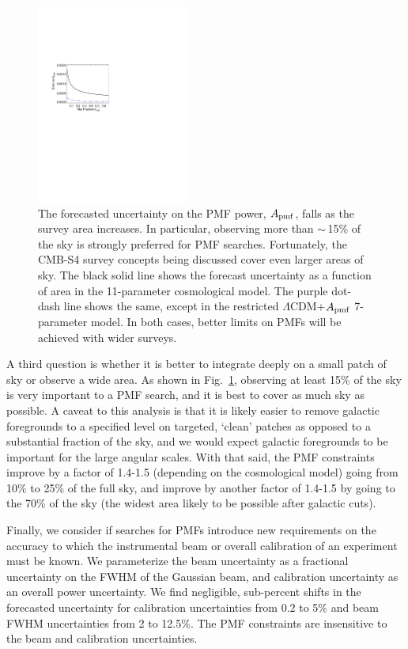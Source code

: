 \documentclass[apj]{emulateapj}
\newcommand{\apmf}{\ensuremath{A_{\rm pmf}}}
\newcommand{\lcdm}{\ensuremath{\Lambda}CDM}
\begin{document}
\begin{figure}[htb]\centering
\includegraphics[width=0.45\textwidth,clip,trim={1.5cm 12.5cm 11cm 7.5cm}]{pmf_area.pdf}
  \caption[Area dependence]{
  The forecasted uncertainty on the PMF power, \apmf{}, falls as the survey area increases. 
  In particular, observing more than $\sim$\,15\% of the sky is strongly preferred for PMF searches. 
  Fortunately, the CMB-S4 survey concepts being discussed cover even larger areas of sky. 
  The black solid line shows the forecast uncertainty as a function of area in the 11-parameter cosmological model.
  The purple dot-dash line shows the same, except in the restricted \lcdm{}+\apmf{} 7-parameter model. 
  In both cases, better limits on PMFs will be achieved with wider surveys.
    \label{fig:area}
  }
\end{figure}
A third question is whether it is better to integrate deeply on a small patch of sky or observe a wide area. 
As shown in  Fig.~\ref{fig:area}, observing at least 15\% of the sky is very important to a PMF search, and it is best  to cover as much sky as possible. 
A caveat to this analysis is that it is likely easier to remove galactic foregrounds to a specified level on targeted, `clean' patches as opposed to a substantial fraction of the sky, and we would expect galactic foregrounds to be important for the large angular scales. 
With that said, the PMF constraints improve by a factor of 1.4-1.5 (depending on the cosmological model) going from 10\% to 25\% of the full sky, and improve by another factor of 1.4-1.5 by going to the 70\% of the sky (the widest area likely to be possible after galactic cuts).


Finally, we consider if searches for PMFs introduce new requirements on the accuracy to which the instrumental beam or overall calibration of an experiment must be known. 
We parameterize the beam uncertainty as a fractional uncertainty on the FWHM of the Gaussian beam, and calibration uncertainty as an overall power uncertainty. 
We find negligible, sub-percent shifts in the forecasted uncertainty for calibration uncertainties from 0.2 to 5\% and beam FWHM uncertainties from 2 to 12.5\%. 
The PMF constraints are insensitive to the beam and calibration uncertainties. 
\end{document}
